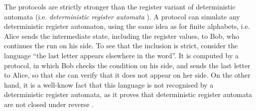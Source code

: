 \begin{myexample}\label{ex:reg-det-too-weak}
    The protocols are strictly stronger than the register variant of deterministic automata
    (i.e. \emph{deterministic register automata} \cite[Definition~3]{kaminskiFiniteMemoryAutomata1994}).
    A protocol can simulate any deterministic register automaton, using the same idea as for finite alphabets,
    i.e. Alice sends the intermediate state, including the register values, to Bob, who 
    continues the run on his side. To see that the inclusion is strict, consider the language
    ``the last letter appears elsewhere in the word''. It is computed by a protocol, 
    in which Bob checks the condition on his side, and sends the last letter to Alice, so that she can verify
    that it does not appear on her side. On the other hand, it is a well-know fact that this language
    is not recognised by a deterministic register automata, as it proves that deterministic register automata 
    are not closed under reverse \cite[Examples~4~and~8]{kaminskiFiniteMemoryAutomata1994}. 
\end{myexample}



    
